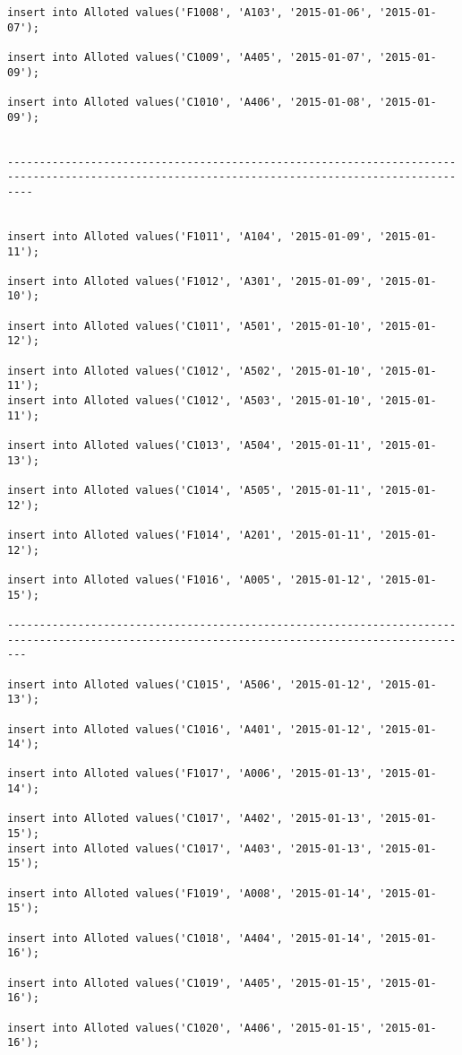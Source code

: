 \documentclass[a4,12pt]{report}
\begin{document}
\begin{lstlisting}
insert into Alloted values('F1008', 'A103', '2015-01-06', '2015-01-07');

insert into Alloted values('C1009', 'A405', '2015-01-07', '2015-01-09');

insert into Alloted values('C1010', 'A406', '2015-01-08', '2015-01-09');


------------------------------------------------------------------------------------------------------------------------------------------------


insert into Alloted values('F1011', 'A104', '2015-01-09', '2015-01-11');

insert into Alloted values('F1012', 'A301', '2015-01-09', '2015-01-10');

insert into Alloted values('C1011', 'A501', '2015-01-10', '2015-01-12');

insert into Alloted values('C1012', 'A502', '2015-01-10', '2015-01-11');
insert into Alloted values('C1012', 'A503', '2015-01-10', '2015-01-11');

insert into Alloted values('C1013', 'A504', '2015-01-11', '2015-01-13');

insert into Alloted values('C1014', 'A505', '2015-01-11', '2015-01-12');

insert into Alloted values('F1014', 'A201', '2015-01-11', '2015-01-12');

insert into Alloted values('F1016', 'A005', '2015-01-12', '2015-01-15');

-----------------------------------------------------------------------------------------------------------------------------------------------

insert into Alloted values('C1015', 'A506', '2015-01-12', '2015-01-13');

insert into Alloted values('C1016', 'A401', '2015-01-12', '2015-01-14');

insert into Alloted values('F1017', 'A006', '2015-01-13', '2015-01-14');

insert into Alloted values('C1017', 'A402', '2015-01-13', '2015-01-15');
insert into Alloted values('C1017', 'A403', '2015-01-13', '2015-01-15');

insert into Alloted values('F1019', 'A008', '2015-01-14', '2015-01-15');

insert into Alloted values('C1018', 'A404', '2015-01-14', '2015-01-16');

insert into Alloted values('C1019', 'A405', '2015-01-15', '2015-01-16');

insert into Alloted values('C1020', 'A406', '2015-01-15', '2015-01-16');


\end{lstlisting}
\end{document}
